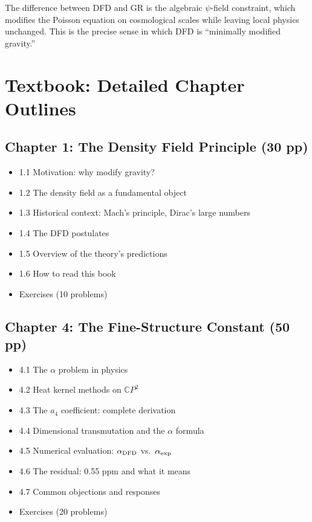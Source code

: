 \documentclass[11pt,a4paper]{article}
\begin{document}
The difference between DFD and GR is the algebraic $\psi$-field constraint, which modifies the Poisson equation on cosmological scales while leaving local physics unchanged. This is the precise sense in which DFD is ``minimally modified gravity.''

\section{Textbook: Detailed Chapter Outlines}

\subsection{Chapter 1: The Density Field Principle (30 pp)}
\begin{itemize}[nosep]
\item 1.1 Motivation: why modify gravity?
\item 1.2 The density field as a fundamental object
\item 1.3 Historical context: Mach's principle, Dirac's large numbers
\item 1.4 The DFD postulates
\item 1.5 Overview of the theory's predictions
\item 1.6 How to read this book
\item Exercises (10 problems)
\end{itemize}

\subsection{Chapter 4: The Fine-Structure Constant (50 pp)}
\begin{itemize}[nosep]
\item 4.1 The $\alpha$ problem in physics
\item 4.2 Heat kernel methods on $\mathbb{C}P^2$
\item 4.3 The $a_4$ coefficient: complete derivation
\item 4.4 Dimensional transmutation and the $\alpha$ formula
\item 4.5 Numerical evaluation: $\alpha_{\rm DFD}$ vs.\ $\alpha_{\rm exp}$
\item 4.6 The residual: 0.55 ppm and what it means
\item 4.7 Common objections and responses
\item Exercises (20 problems)
\end{itemize}
\end{document}
